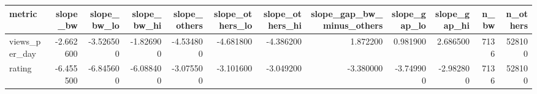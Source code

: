 \begin{tabular}{lrrrrrrrrrrr}
\toprule
metric & slope_bw & slope_bw_lo & slope_bw_hi & slope_others & slope_others_lo & slope_others_hi & slope_gap_bw_minus_others & slope_gap_lo & slope_gap_hi & n_bw & n_others \\
\midrule
views_per_day & -2.662600 & -3.526500 & -1.826900 & -4.534800 & -4.681800 & -4.386200 & 1.872200 & 0.981900 & 2.686500 & 7136 & 528100 \\
rating & -6.455500 & -6.845600 & -6.088400 & -3.075500 & -3.101600 & -3.049200 & -3.380000 & -3.749900 & -2.982800 & 7136 & 528100 \\
\bottomrule
\end{tabular}
